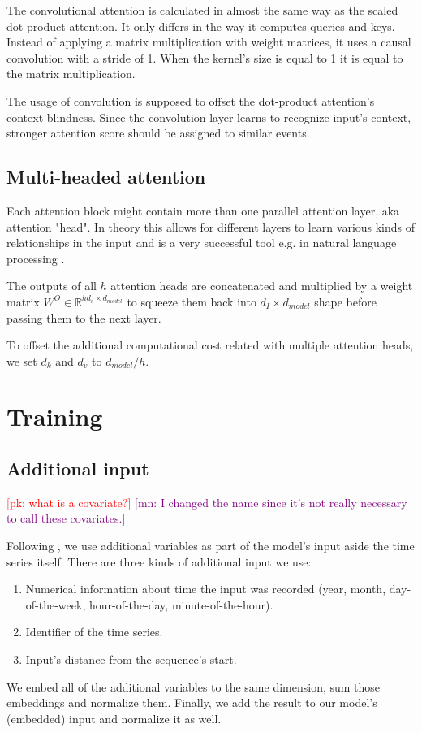 \documentclass[en]{pracamgr}
\newcommand{\pk}[1]{\textcolor{red}{\small [pk: #1]}}
\newcommand{\mn}[1]{\textcolor{purple}{\small [mn: #1]}}
\begin{document}
The convolutional attention \cite{enhancing} is calculated in almost the same way as the scaled dot-product attention. 
It only differs in the way it computes queries and keys.
Instead of applying a matrix multiplication with weight matrices, it uses a causal convolution with a stride of 1. When the kernel's size is equal to 1 it is equal to the matrix multiplication.

The usage of convolution is supposed to offset the dot-product attention's context-blindness. Since the convolution layer learns to recognize input's context, stronger attention score should be assigned to similar events.

\subsection{Multi-headed attention}

Each attention block might contain more than one parallel attention layer, aka attention "head". In theory this allows for different layers to learn various kinds of relationships in the input and is a very successful tool e.g. in natural language processing \cite{tr}.

The outputs of all $h$ attention heads are concatenated and multiplied by a weight matrix $W^O \in \mathbb{R}^{hd_{v} \times d_{model}}$ to squeeze them back into $d_I \times d_{model}$ shape before passing them to the next layer.

To offset the additional computational cost related with multiple attention heads, we set $d_k$ and $d_v$ to $d_{model} / h$.

\section{Training}

\subsection{Additional input} \pk{what is a covariate?} \mn{I changed the name since it's not really necessary to call these covariates.}

Following \cite{enhancing}, we use additional variables as part of the model's input aside the time series itself.
There are three kinds of additional input we use:
\begin{enumerate}
	\item Numerical information about time the input was recorded (year, month, day-of-the-week, hour-of-the-day, minute-of-the-hour). 

	\item Identifier of the time series.

	\item Input's distance from the sequence's start. 

\end{enumerate}
We embed all of the additional variables to the same dimension, sum those embeddings and normalize them. Finally, we add the result to our model's (embedded) input and normalize it as well.
\end{document}
